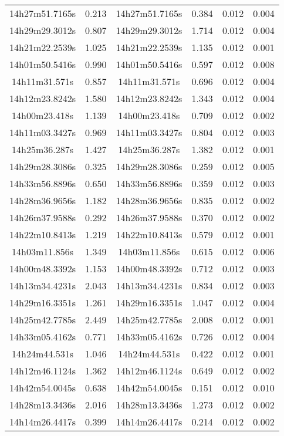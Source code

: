 \begin{table}
\begin{tabular}{cccccc}
14h27m51.7165s & 0.213 & 14h27m51.7165s & 0.384 & 0.012 & 0.004 \\
14h29m29.3012s & 0.807 & 14h29m29.3012s & 1.714 & 0.012 & 0.004 \\
14h21m22.2539s & 1.025 & 14h21m22.2539s & 1.135 & 0.012 & 0.001 \\
14h01m50.5416s & 0.990 & 14h01m50.5416s & 0.597 & 0.012 & 0.008 \\
14h11m31.571s & 0.857 & 14h11m31.571s & 0.696 & 0.012 & 0.004 \\
14h12m23.8242s & 1.580 & 14h12m23.8242s & 1.343 & 0.012 & 0.004 \\
14h00m23.418s & 1.139 & 14h00m23.418s & 0.709 & 0.012 & 0.002 \\
14h11m03.3427s & 0.969 & 14h11m03.3427s & 0.804 & 0.012 & 0.003 \\
14h25m36.287s & 1.427 & 14h25m36.287s & 1.382 & 0.012 & 0.001 \\
14h29m28.3086s & 0.325 & 14h29m28.3086s & 0.259 & 0.012 & 0.005 \\
14h33m56.8896s & 0.650 & 14h33m56.8896s & 0.359 & 0.012 & 0.003 \\
14h28m36.9656s & 1.182 & 14h28m36.9656s & 0.835 & 0.012 & 0.002 \\
14h26m37.9588s & 0.292 & 14h26m37.9588s & 0.370 & 0.012 & 0.002 \\
14h22m10.8413s & 1.219 & 14h22m10.8413s & 0.579 & 0.012 & 0.001 \\
14h03m11.856s & 1.349 & 14h03m11.856s & 0.615 & 0.012 & 0.006 \\
14h00m48.3392s & 1.153 & 14h00m48.3392s & 0.712 & 0.012 & 0.003 \\
14h13m34.4231s & 2.043 & 14h13m34.4231s & 0.834 & 0.012 & 0.003 \\
14h29m16.3351s & 1.261 & 14h29m16.3351s & 1.047 & 0.012 & 0.004 \\
14h25m42.7785s & 2.449 & 14h25m42.7785s & 2.008 & 0.012 & 0.001 \\
14h33m05.4162s & 0.771 & 14h33m05.4162s & 0.726 & 0.012 & 0.004 \\
14h24m44.531s & 1.046 & 14h24m44.531s & 0.422 & 0.012 & 0.001 \\
14h12m46.1124s & 1.362 & 14h12m46.1124s & 0.649 & 0.012 & 0.002 \\
14h42m54.0045s & 0.638 & 14h42m54.0045s & 0.151 & 0.012 & 0.010 \\
14h28m13.3436s & 2.016 & 14h28m13.3436s & 1.273 & 0.012 & 0.002 \\
14h14m26.4417s & 0.399 & 14h14m26.4417s & 0.214 & 0.012 & 0.002 \\

\end{tabular}
\end{table}

